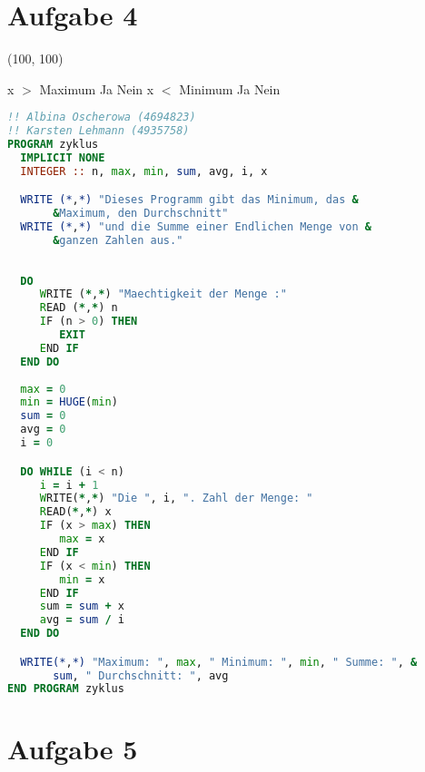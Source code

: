 \documentclass{article}
\begin{document}
\section*{Aufgabe 4}

\begin{struktogramm}(100, 100)
  \untilend
  

     {x $>$ Maximum} {Ja} {Nein}
      \change
    \ifend
     {x $<$ Minimum} {Ja} {Nein}
      \change
    \ifend
  \whileend
\end{struktogramm}

\newpage
\begin{lstlisting}[language=Fortran, showstringspaces=false]
!! Albina Oscherowa (4694823)
!! Karsten Lehmann (4935758)
PROGRAM zyklus
  IMPLICIT NONE
  INTEGER :: n, max, min, sum, avg, i, x

  WRITE (*,*) "Dieses Programm gibt das Minimum, das &
       &Maximum, den Durchschnitt"
  WRITE (*,*) "und die Summe einer Endlichen Menge von &
       &ganzen Zahlen aus."
 
  
  DO
     WRITE (*,*) "Maechtigkeit der Menge :"
     READ (*,*) n
     IF (n > 0) THEN
        EXIT
     END IF
  END DO
  
  max = 0
  min = HUGE(min)
  sum = 0
  avg = 0
  i = 0

  DO WHILE (i < n)
     i = i + 1
     WRITE(*,*) "Die ", i, ". Zahl der Menge: "
     READ(*,*) x
     IF (x > max) THEN
        max = x
     END IF
     IF (x < min) THEN
        min = x
     END IF
     sum = sum + x
     avg = sum / i
  END DO

  WRITE(*,*) "Maximum: ", max, " Minimum: ", min, " Summe: ", &
       sum, " Durchschnitt: ", avg
END PROGRAM zyklus
\end{lstlisting}

\section*{Aufgabe 5}
\end{document}
